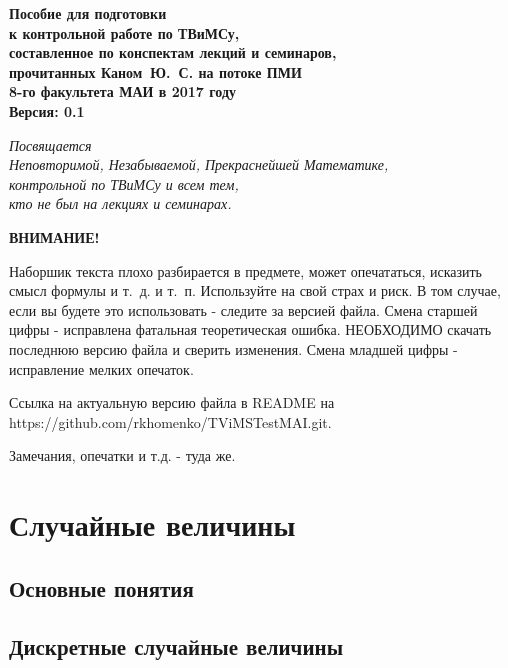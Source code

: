 \documentclass[12pt]{report}
\theoremstyle{plain}
\theoremstyle{definition}
\begin{document}
\begin{titlepage}
    \centering
    \vspace{5cm}
    \Large{\textbf{
        Пособие для подготовки\\
        к контрольной работе по ТВиМСу, \\
        составленное по конспектам лекций и семинаров, \\
        прочитанных Каном~Ю.~С. на потоке ПМИ \\
        8-го факультета МАИ в 2017 году}} \\
    \vspace{15cm}
    \textbf{Версия: 0.1}
\end{titlepage}

\thispagestyle{empty}
\begin{flushright}
    \Large{\textit{
        Посвящается \\ Неповторимой, Незабываемой, Прекраснейшей Математике, \\
        контрольной по ТВиМСу и всем тем, \\
        кто не был на лекциях и семинарах.
    }}
\end{flushright}
\newpage

\thispagestyle{empty}
\begin{center}
    \LARGE{\textbf{ВНИМАНИЕ!}}
\end{center}
\Large{
    Наборшик текста плохо разбирается в предмете, может опечататься, исказить смысл формулы и т.~д. и т.~п.
    Используйте на свой страх и риск. В том случае, если вы будете это использовать - следите за
    версией файла. Смена старшей цифры - исправлена фатальная теоретическая ошибка. НЕОБХОДИМО
    скачать последнюю версию файла и сверить изменения. Смена младшей цифры - исправление мелких опечаток.

    Ссылка на актуальную версию файла в README на \\ https://github.com/rkhomenko/TViMSTestMAI.git.

    Замечания, опечатки и т.д. - туда же.
}
\newpage

\tableofcontents

\chapter{Случайные величины}
\section{Основные понятия}
\section{Дискретные случайные величины}
\end{document}
